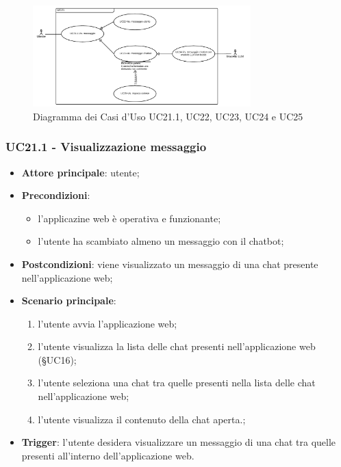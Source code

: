 \documentclass[10pt, a4paper]{article}
\begin{document}
    \begin{figure}[h]
        \centering
        \includegraphics[width=0.75\textwidth, height=0.75\textheight, keepaspectratio]{UC-images/UC21.1-UC22-UC23-UC24-UC25.png}
        \caption{Diagramma dei Casi d'Uso UC21.1, UC22, UC23, UC24 e UC25}
    \end{figure}
    
    \subsubsection{UC21.1 - Visualizzazione messaggio}
    \begin{itemize}
        \item \textbf{Attore principale}: utente;
        \item \textbf{Precondizioni}: 
        \begin{itemize}
            \item l'applicazine web è operativa e funzionante;
            \item l'utente ha scambiato almeno un messaggio con il chatbot;
        \end{itemize}
        \item \textbf{Postcondizioni}: viene visualizzato un messaggio di una chat presente nell'applicazione web;
        \item \textbf{Scenario principale}:
            \begin{enumerate}
                \item l'utente avvia l'applicazione web;
                \item l'utente visualizza la lista delle chat presenti nell'applicazione web (\S UC16);
                \item l'utente seleziona una chat tra quelle presenti nella lista delle chat nell'applicazione web;
                \item l'utente visualizza il contenuto della chat aperta.;
            \end{enumerate}
        \item \textbf{Trigger}: l'utente desidera visualizzare un messaggio di una chat tra quelle presenti all'interno dell'applicazione web.
    \end{itemize}
\end{document}
